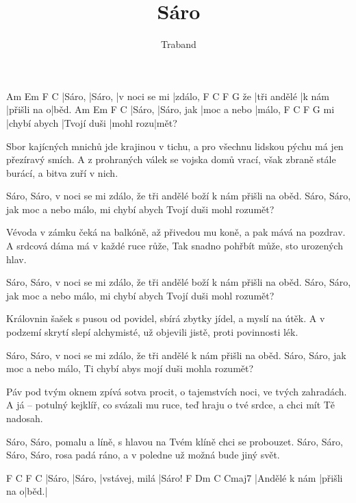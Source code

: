 \documentclass{song}
\title{Sáro}
\author{Traband}
\begin{document}
\begin{multicols}{2}

\strophe
Am     Em     F             C
|Sáro, |Sáro, |v noci se mi |zdálo,
   F           C      F           G
že |tři andělé |k nám |přišli na o|běd.
Am     Em         F           C
|Sáro, |Sáro, jak |moc a nebo |málo,
   F            C           F         G
mi |chybí abych |Tvojí duši |mohl rozu|mět?
\endstrophe

\strophe*
Sbor kajícných mnichů jde krajinou v tichu,
a pro všechnu lidskou pýchu má jen přezíravý smích.
A z prohraných válek se vojska domů vrací,
však zbraně stále burácí, a bitva zuří v nich.
\endstrophe

\strophe*
Sáro, Sáro, v noci se mi zdálo,
že tři andělé boží k nám přišli na oběd.
Sáro, Sáro, jak moc a nebo málo,
mi chybí abych Tvojí duši mohl rozumět?
\endstrophe

\strophe*
Vévoda v zámku čeká na balkóně,
až přivedou mu koně, a pak mává na pozdrav.
A srdcová dáma má v každé ruce růže,
Tak snadno pohřbít může, sto urozených hlav.
\endstrophe

\strophe*
Sáro, Sáro, v noci se mi zdálo,
že tři andělé boží k nám přišli na oběd.
Sáro, Sáro, jak moc a nebo málo,
mi chybí abych Tvojí duši mohl rozumět?
\endstrophe

\columnbreak

\strophe*
Královnin šašek s pusou od povidel,
sbírá zbytky jídel, a myslí na útěk.
A v podzemí skrytí slepí alchymisté,
už objevili jistě, proti povinnosti lék.
\endstrophe

\strophe*
Sáro, Sáro, v noci se mi zdálo,
že tři andělé k nám přišli na oběd.
Sáro, Sáro, jak moc a nebo málo,
Ti chybí abys mojí duši mohla rozumět?
\endstrophe

\strophe*
Páv pod tvým oknem zpívá sotva procit,
o tajemstvích noci, ve tvých zahradách.
A já -- potulný kejklíř, co svázali mu ruce,
teď hraju o tvé srdce, a chci mít Tě nadosah.
\endstrophe

\strophe*
Sáro, Sáro, pomalu a líně,
s hlavou na Tvém klíně chci se probouzet.
Sáro, Sáro, Sáro, Sáro, rosa padá ráno,
a v poledne už možná bude jiný svět.
\endstrophe

\strophe
F      C      F              C
|Sáro, |Sáro, |vstávej, milá |Sáro!
F             Dm          C    Cmaj7
|Andělé k nám |přišli na o|běd.|
\endstrophe

\end{multicols}
\end{document}
